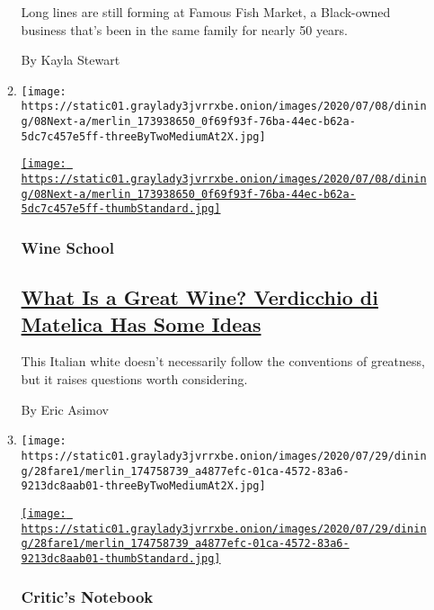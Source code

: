 \begin{enumerate}
\begin{enumerate}
    Long lines are still forming at Famous Fish Market, a Black-owned
    business that's been in the same family for nearly 50 years.

    By Kayla Stewart
  \item
    \texttt{[image: https://static01.graylady3jvrrxbe.onion/images/2020/07/08/dining/08Next-a/merlin\_173938650\_0f69f93f-76ba-44ec-b62a-5dc7c457e5ff-threeByTwoMediumAt2X.jpg]}

    \href{/2020/07/30/dining/drinks/wine-school-verdicchio-di-matelica.html}{\texttt{[image: https://static01.graylady3jvrrxbe.onion/images/2020/07/08/dining/08Next-a/merlin\_173938650\_0f69f93f-76ba-44ec-b62a-5dc7c457e5ff-thumbStandard.jpg]}}

    \hypertarget{wine-school}{%
    \subsubsection{Wine School}\label{wine-school}}

    \hypertarget{what-is-a-great-wine-verdicchio-di-matelica-has-some-ideas}{%
    \subsection{\texorpdfstring{\href{/2020/07/30/dining/drinks/wine-school-verdicchio-di-matelica.html}{What
    Is a Great Wine? Verdicchio di Matelica Has Some
    Ideas}}{What Is a Great Wine? Verdicchio di Matelica Has Some Ideas}}\label{what-is-a-great-wine-verdicchio-di-matelica-has-some-ideas}}

    This Italian white doesn't necessarily follow the conventions of
    greatness, but it raises questions worth considering.

    By Eric Asimov
  \item
    \texttt{[image: https://static01.graylady3jvrrxbe.onion/images/2020/07/29/dining/28fare1/merlin\_174758739\_a4877efc-01ca-4572-83a6-9213dc8aab01-threeByTwoMediumAt2X.jpg]}

    \href{/2020/07/28/dining/melbourne-restaurants-coronavirus.html}{\texttt{[image: https://static01.graylady3jvrrxbe.onion/images/2020/07/29/dining/28fare1/merlin\_174758739\_a4877efc-01ca-4572-83a6-9213dc8aab01-thumbStandard.jpg]}}

    \hypertarget{critics-notebook}{%
    \subsubsection{Critic's Notebook}\label{critics-notebook}}


\end{enumerate}
\end{enumerate}
